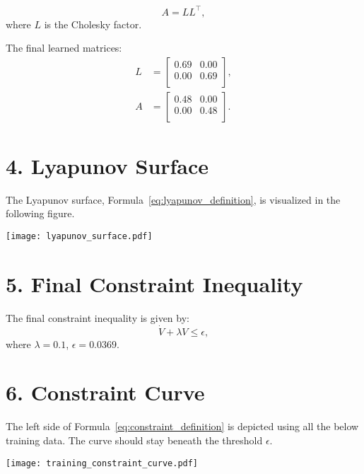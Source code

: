 \documentclass[11pt]{article}
\begin{document}
\begin{equation}
A = L L^\top,
\end{equation}
where $L$ is the Cholesky factor.

The final learned matrices:
\begin{align}
L &= \begin{bmatrix}
0.69 & 0.00 \\
0.00 & 0.69 \\
\end{bmatrix}, \\
A &= \begin{bmatrix}
0.48 & 0.00 \\
0.00 & 0.48 \\
\end{bmatrix}.
\end{align}

\section*{4. Lyapunov Surface}
The Lyapunov surface, Formula~\eqref{eq:lyapunov_definition}, is visualized in the following figure.
\begin{center}
\texttt{[image: lyapunov\_surface.pdf]}
\end{center}

\section*{5. Final Constraint Inequality}
The final constraint inequality is given by:
\begin{equation}
\dot{V} + \lambda V \leq \epsilon,
\label{eq:constraint_definition}
\end{equation}
where $\lambda = 0.1$, $\epsilon = 0.0369$.

\section*{6. Constraint Curve}
The left side of Formula~\eqref{eq:constraint_definition} is depicted using all the below training data. The curve should stay beneath the threshold $\epsilon$.

\begin{center}
\texttt{[image: training\_constraint\_curve.pdf]}
\end{center}
\end{document}
